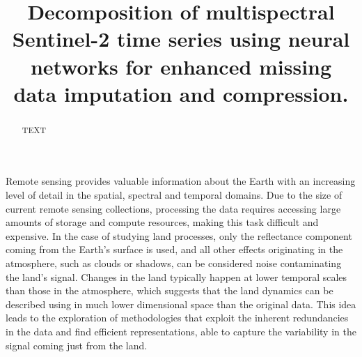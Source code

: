 \documentclass[essd, manuscript]{copernicus}
\begin{document}
\title{Decomposition of multispectral Sentinel-2 time series using neural networks for enhanced missing data imputation and compression.}











\received{}
\pubdiscuss{} %
\revised{}
\accepted{}
\published{}



\maketitle

\begin{abstract}
TEXT
\end{abstract}


\introduction  %

Remote sensing provides valuable information about the Earth with an increasing level of detail in the spatial, spectral and temporal domains. Due to the size of current remote sensing collections, processing the data requires accessing large amounts of storage and compute resources, making this task difficult and expensive. In the case of studying land processes, only the reflectance component coming from the Earth's surface is used, and all other effects originating in the atmosphere, such as clouds or shadows, can be considered noise contaminating the land's signal. Changes in the land typically happen at lower temporal scales than those in the atmosphere, which suggests that the land dynamics can be described using in much lower dimensional space than the original data. This idea leads to the exploration of methodologies that exploit the inherent redundancies in the data and find efficient representations, able to capture the variability in the signal coming just from the land.
\end{document}
